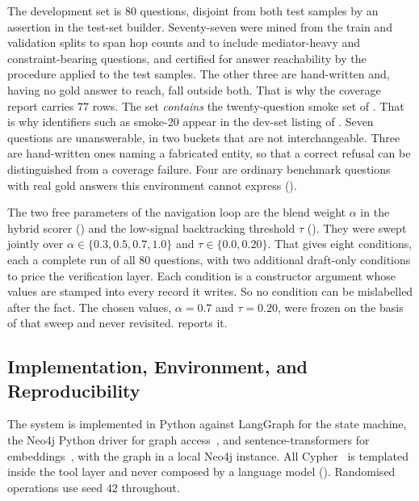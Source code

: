 \label{sec:dev-construction}%
The development set is $80$ questions, disjoint from both test samples by an
assertion in the test-set builder. Seventy-seven were mined from the train and
validation splits to span hop counts and to include mediator-heavy and
constraint-bearing questions, and certified for answer reachability by the
procedure applied to the test samples. The other three are hand-written and,
having no gold answer to reach, fall outside both. That is why the coverage
report carries $77$ rows. The set \emph{contains} the twenty-question smoke set
of . That is why identifiers such as
\textsf{smoke-20} appear in the dev-set listing of . Seven
questions are unanswerable, in two buckets that are not interchangeable. Three
are hand-written ones naming a fabricated entity, so that a correct refusal can
be distinguished from a coverage failure. Four are ordinary benchmark questions
with real gold answers this environment cannot express
().

The two free parameters of the navigation loop are the blend weight $\alpha$ in
the hybrid scorer () and the low-signal backtracking threshold
$\tau$ (). They were swept jointly over $\alpha \in
\{0.3, 0.5, 0.7, 1.0\}$ and $\tau \in \{0.0, 0.20\}$. That gives eight
conditions, each a complete run of all $80$ questions, with two additional
draft-only conditions to price the verification layer. Each condition is a
constructor argument whose values are stamped into every record it writes. So no
condition can be mislabelled after the fact. The chosen values, $\alpha = 0.7$
and $\tau = 0.20$, were frozen on the basis of that sweep and never revisited.
 reports it.

\subsection{Implementation, Environment, and
Reproducibility}\label{sec:implementation}

The system is implemented in Python against LangGraph for the state machine, the
Neo4j Python driver for graph access~\cite{robinson2015graph}, and
sentence-transformers for embeddings~\cite{reimers2019sentence}, with the graph
in a local Neo4j instance. All Cypher~\cite{francis2018cypher} is templated
inside the tool layer and never composed by a language model
(). Randomised operations use seed $42$ throughout.

